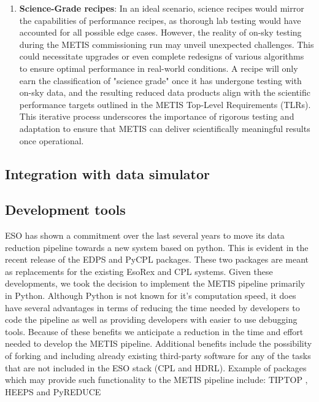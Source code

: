 \documentclass[a4paper]{spie}  %
\begin{document}
\begin{enumerate}
     \item \textbf{Science-Grade recipes}: In an ideal scenario, science recipes would mirror the capabilities of performance recipes, as thorough lab testing would have accounted for all possible edge cases. However, the reality of on-sky testing during the METIS commissioning run may unveil unexpected challenges. This could necessitate upgrades or even complete redesigns of various algorithms to ensure optimal performance in real-world conditions. A recipe will only earn the classification of "science grade" once it has undergone testing with on-sky data, and the resulting reduced data products align with the scientific performance targets outlined in the METIS Top-Level Requirements (TLRs). This iterative process underscores the importance of rigorous testing and adaptation to ensure that METIS can deliver scientifically meaningful results once operational. 
 \end{enumerate}


\subsection{Integration with data simulator}
\label{subsec:imp_sim}





\subsection{Development tools}
\label{subsec:imp_tools}
ESO has shown a commitment over the last several years to move its data reduction pipeline towards a new system based on python. 
This is evident in the recent release of the EDPS \cite{edps} and PyCPL \cite{pycpl} packages.
These two packages are meant as replacements for the existing EsoRex and CPL systems.
Given these developments, we took the decision to implement the METIS pipeline primarily in Python.
Although Python is not known for it's computation speed, it does have several advantages in terms of  reducing the time needed by developers to code the pipeline as well as providing developers with easier to use debugging tools. 
Because of these benefits we anticipate a reduction in the time and effort needed to develop the METIS pipeline.
Additional benefits include the possibility of forking and including already existing third-party software for any of the tasks that are not included in the ESO stack (CPL and HDRL). 
Example of packages which may provide such functionality to the METIS pipeline include: TIPTOP \cite{tiptop}, HEEPS \cite{HEEPS} and PyREDUCE \cite{pyreduce}
\end{document}
